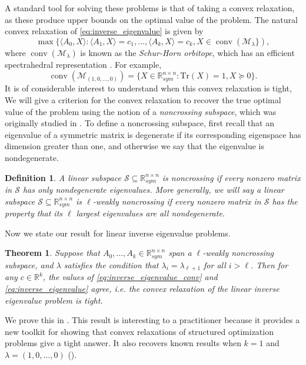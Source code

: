 \documentclass{article}
\numberwithin{equation}{section}
\newcommand{\tr}{\mathrm{Tr}}
\newcommand{\R}{\mathbb{R}}
\DeclareMathOperator*{\conv}{conv}
\newtheorem{theorem}{Theorem}[section]
\newtheorem{definition}{Definition}[section]
\newcommand{\cM}{{\mathcal{M}}}
\newcommand{\subspace}{\mathcal{S}}
\newcommand{\demph}[1]{\emph{{\color{RoyalBlue}#1}}}
\begin{document}
A standard tool for solving these problems is that of taking a convex relaxation, as these produce upper bounds on the optimal value of the problem.
The natural convex relaxation of \eqref{eq:inverse_eigenvalue} is given by
\begin{equation}
    \max \{\langle A_0, X\rangle : \langle A_1, X\rangle = c_1, \dots, \langle A_k, X\rangle = c_k, X \in \conv(\cM_{\lambda}\}),
    \label{eq:inverse_eigenvalue_conv}\tag{cr-LIEP}
\end{equation}
where $\conv(\cM_{\lambda})$ is known as the \demph{Schur-Horn orbitope}, which has an efficient spectrahedral representation \cite{sanyal2011orbitopes}. For example, \[\conv(\cM_{(1,0,\dots, 0)}) = \{X \in \R^{n \times n}_{sym} : \tr(X) = 1, X \succeq 0\}.\]
It is of considerable interest to understand when this convex relaxation is tight,
We will give a criterion for the convex relaxation to recover the true optimal value of the problem using the notion of a \emph{noncrossing subspace}, which was originally studied in \cite{crossing}.
To define a noncrossing subspace, first recall that an eigenvalue of a symmetric matrix is degenerate if its corresponding eigenspace has dimension greater than one, and otherwise we say that the eigenvalue is nondegenerate.

\begin{definition}\label{def:noncrossing-subspace}
A linear subspace $\subspace \subseteq \R_{sym}^{n\times n}$ is \demph{noncrossing} if every nonzero matrix in $\subspace$ has only nondegenerate eigenvalues.
More generally, we will say a linear subspace $\subspace \subseteq \R_{sym}^{n\times n}$ is \demph{$\ell$-weakly noncrossing} if every nonzero matrix in $\subspace$ has the property that its $\ell$ largest eigenvalues are all nondegenerate.
\end{definition}

Now we state our result for linear inverse eigenvalue problems.
\begin{theorem}
\label{thm:eigenvalues}
    Suppose that $A_0, \dots, A_k\in\R_{sym}^{n\times n}$ span a $\ell$-weakly noncrossing subspace, and $\lambda$ satisfies the condition that $\lambda_{i} = \lambda_{\ell+1}$ for all $i > \ell$.
    Then for any $c \in \R^{k}$, the values of \eqref{eq:inverse_eigenvalue_conv} and \eqref{eq:inverse_eigenvalue} agree, i.e. the convex relaxation of the linear inverse eigenvalue problem is tight.
\end{theorem}
We prove this in .
This result is interesting to a practitioner because it provides a new toolkit for showing that convex relaxations of structured optimization problems give a tight answer. 
It also recovers 
known results when $k=1$
\cite{au1984some}
 and $\lambda=(1,0,\dots,0)$ (\cite{gutkin2004convexity}).
\end{document}
